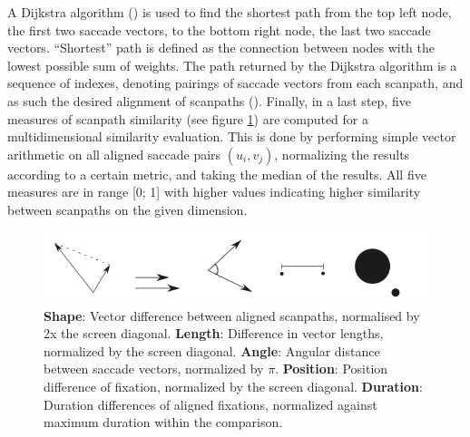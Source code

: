 \documentclass[a4paper, 12pt]{scrreprt}
\begin{document}
A Dijkstra algorithm (\cite{dijkstra1959note}) is used to find the shortest path from the top left node, the first two saccade vectors, to the bottom right node, the last two saccade vectors. “Shortest” path is defined as the connection between nodes with the lowest possible sum of weights. The path returned by the Dijkstra algorithm is a sequence of indexes, denoting pairings of saccade vectors from each scanpath, and as such the desired alignment of scanpaths (\cite{dewhurst2012depends}).  Finally, in a last step, five measures of scanpath similarity (see figure \ref{fig:simmeasures}) are computed for a multidimensional similarity evaluation. This is done by performing simple vector arithmetic on all aligned saccade pairs $(u_i, v_j)$, normalizing the results according to a certain metric, and taking the median of the results. All five measures are in range [0; 1] with higher values indicating higher similarity between scanpaths on the given dimension. \newline

\begin{figure}[H]
	\includegraphics[scale=0.5]{img/simmeasures.png}
	\caption[Similarity measures]{\small{\textbf{Shape}: Vector difference between aligned scanpaths, normalised by 2x the screen diagonal. \textbf{Length}: Difference in vector lengths, normalized by the screen diagonal. \textbf{Angle}: Angular distance between saccade vectors, normalized by $\pi$. \textbf{Position}: Position difference of fixation, normalized by the screen diagonal. \textbf{Duration}: Duration differences of aligned fixations, normalized against maximum duration within the comparison.}}
	\label{fig:simmeasures}
\end{figure}
\end{document}
